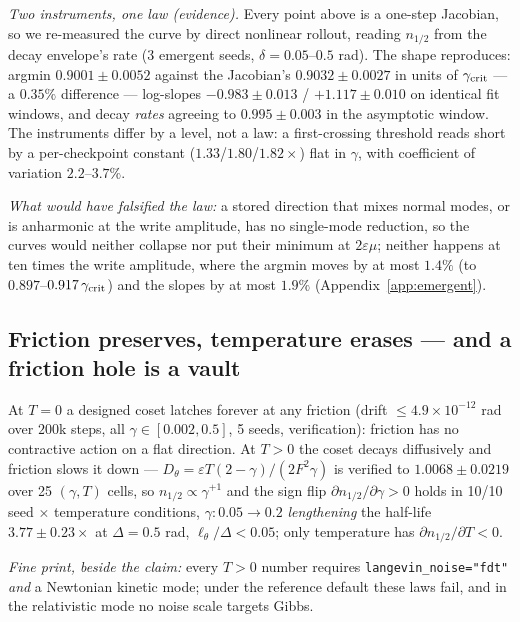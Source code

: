 \emph{Two instruments, one law (evidence).} Every point above is a one-step Jacobian, so we re-measured the curve by direct nonlinear rollout, reading $n_{1/2}$ from the decay envelope's rate (3 emergent seeds, $\delta=0.05$--$0.5$ rad). The shape reproduces: argmin $0.9001\pm0.0052$ against the Jacobian's $0.9032\pm0.0027$ in units of $\gamma_{\rm crit}$ --- a $0.35\%$ difference --- log-slopes $-0.983\pm0.013$ / $+1.117\pm0.010$ on identical fit windows, and decay \emph{rates} agreeing to $0.995\pm0.003$ in the asymptotic window. The instruments differ by a level, not a law: a first-crossing threshold reads short by a per-checkpoint constant ($1.33$/$1.80$/$1.82\times$) flat in $\gamma$, with coefficient of variation $2.2$--$3.7\%$. {\footnotesize\emph{What would have falsified the law:} a stored direction that mixes normal modes, or is anharmonic at the write amplitude, has no single-mode reduction, so the curves would neither collapse nor put their minimum at $2\varepsilon\mu$; neither happens at ten times the write amplitude, where the argmin moves by at most $1.4\%$ (to $0.897$--$0.917\,\gamma_{\rm crit}$) and the slopes by at most $1.9\%$ (Appendix~\ref{app:emergent}).\par}

\subsection{Friction preserves, temperature erases --- and a friction hole is a vault}\label{sec:vault}

At $T=0$ a designed coset latches forever at any friction (drift $\le4.9\times10^{-12}$ rad over $200$k steps, all $\gamma\in[0.002,0.5]$, 5 seeds, verification): friction has no contractive action on a flat direction. At $T>0$ the coset decays diffusively and friction slows it down --- $D_\theta=\varepsilon T(2-\gamma)/(2F^2\gamma)$ is verified to $1.0068\pm0.0219$ over 25 $(\gamma,T)$ cells, so $n_{1/2}\propto\gamma^{+1}$ and the sign flip $\partial n_{1/2}/\partial\gamma>0$ holds in 10/10 seed $\times$ temperature conditions, $\gamma:0.05\to0.2$ \emph{lengthening} the half-life $3.77\pm0.23\times$ at $\Delta=0.5$ rad, $\ell_\theta/\Delta<0.05$; only temperature has $\partial n_{1/2}/\partial T<0$. {\footnotesize\emph{Fine print, beside the claim:} every $T>0$ number requires \texttt{langevin\_noise="fdt"} \emph{and} a Newtonian kinetic mode; under the reference default these laws fail, and in the relativistic mode no noise scale targets Gibbs.\par}

